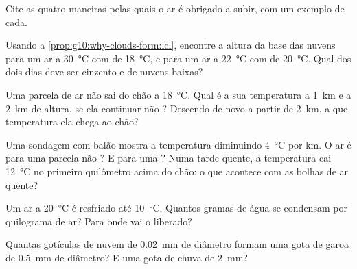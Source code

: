 \begin{exercise}[$\star$]\label{exo:g10:why-clouds-form:5}
Cite as quatro maneiras pelas quais o ar é obrigado a subir, com um exemplo
de cada.
\end{exercise}

\begin{exercise}[$\star\star$]\label{exo:g10:why-clouds-form:6}
Usando a \cref{prop:g10:why-clouds-form:lcl}, encontre a altura da base das
nuvens para um ar a \qty{30}{\degreeCelsius} com  de
\qty{18}{\degreeCelsius}, e para um ar a \qty{22}{\degreeCelsius} com  de \qty{20}{\degreeCelsius}. Qual dos dois dias deve ser cinzento
e de nuvens baixas?
\end{exercise}

\begin{exercise}[$\star\star$]\label{exo:g10:why-clouds-form:7}
Uma parcela de ar não  sai do chão a \qty{18}{\degreeCelsius}. Qual é
a sua temperatura a \qty{1}{km} e a \qty{2}{km} de altura, se ela continuar
não ? Descendo de novo a partir de \qty{2}{km}, a que temperatura
ela chega ao chão?
\end{exercise}

\begin{exercise}[$\star\star$]\label{exo:g10:why-clouds-form:8}
Uma sondagem com balão mostra a temperatura diminuindo
\qty{4}{\degreeCelsius} por km. O ar é  para uma parcela não
? E para uma ? Numa tarde quente, a temperatura cai
\qty{12}{\degreeCelsius} no primeiro quilômetro acima do chão: o que
acontece com as bolhas de ar quente?
\end{exercise}

\begin{exercise}[$\star\star$]\label{exo:g10:why-clouds-form:9}
Um ar  a \qty{20}{\degreeCelsius} é resfriado até
\qty{10}{\degreeCelsius}. Quantos gramas de água se condensam por quilograma
de ar? Para onde vai o  liberado?
\end{exercise}

\begin{exercise}[$\star\star$]\label{exo:g10:why-clouds-form:10}
Quantas gotículas de nuvem de \qty{0.02}{mm} de diâmetro formam uma gota de
garoa de \qty{0.5}{mm} de diâmetro? E uma gota de chuva de \qty{2}{mm}?
\end{exercise}


